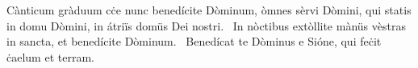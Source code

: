 { Cànticum gràduum}
{%
cċe nunc benedícite Dòminum, òmnes sèrvi Dòmini, qui statis in domu Dòmini, in átriïs domüs Dei nostri. 
~In nòctibus extòllite mànüs vèstras in sancta, et benedícite Dòminum. 
~Benedícat te Dòminus e Sióne, qui feċit ċaelum et terram. 
}
